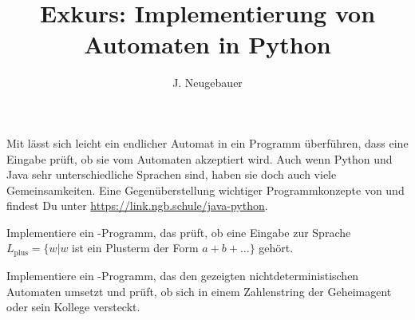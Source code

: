 \documentclass[10pt, a4paper]{scrartcl}
\author{J. Neugebauer}
\title{Exkurs: Implementierung von Automaten in Python}
\date{\Heute}
\begin{document}
\ReiheTitel

Mit  lässt sich leicht ein endlicher Automat in ein Programm überführen, dass eine Eingabe prüft, ob sie vom Automaten akzeptiert wird. Auch wenn Python und Java sehr unterschiedliche Sprachen sind, haben sie doch auch viele Gemeinsamkeiten. Eine Gegenüberstellung wichtiger Programmkonzepte von  und  findest Du unter \url{https://link.ngb.schule/java-python}.



\begin{aufgabe}[subtitle=Implementierung eines DEA: Plusterme]
\label{aufg:py-dea}
Implementiere ein -Programm, das prüft, ob eine Eingabe zur Sprache $L_\text{plus} = \{ w | w$ ist ein Plusterm der Form $a + b + \dots \}$ gehört.
\begin{center}
\begin{transitiongraph}[fa]
	
\end{transitiongraph}
\end{center}
\end{aufgabe}

\begin{aufgabe}[subtitle=Implementierung eines NEA: Bond]
\label{aufg:py-nea}
Implementiere ein -Programm, das den gezeigten nichtdeterministischen Automaten umsetzt und prüft, ob sich in einem Zahlenstring der Geheimagent  oder sein Kollege  versteckt.
\begin{center}
\begin{transitiongraph}[fa]
	
\end{transitiongraph}
\end{center}
\end{aufgabe}
\end{document}
